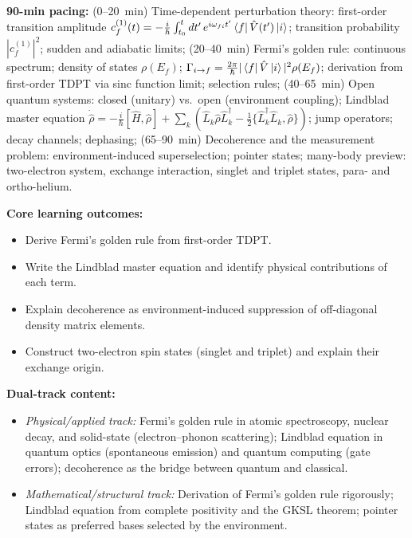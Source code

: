 \documentclass[11pt,a4paper]{article}
\begin{document}
\medskip
\begin{tcolorbox}[modulebox, title={Module~I.3 --- Lecture L10: Time-Dependent PT, Open Systems, and Many-Body Preview}]
\textbf{90-min pacing:} (0--20~min) Time-dependent perturbation theory:
first-order transition amplitude
$c_f^{(1)}(t)=-\tfrac{i}{\hbar}\int_{t_0}^{t}dt'\,e^{i\omega_{fi}t'}\bra{f}\hat{V}(t')\ket{i}$;
transition probability $|c_f^{(1)}|^2$; sudden and adiabatic limits;
(20--40~min) Fermi's golden rule:
continuous spectrum; density of states $\rho(E_f)$;
$\Gamma_{i\to f}=\tfrac{2\pi}{\hbar}|\bra{f}\hat{V}\ket{i}|^2\rho(E_f)$;
derivation from first-order TDPT via sinc function limit; selection rules;
(40--65~min) Open quantum systems: closed (unitary) vs.\ open (environment coupling);
Lindblad master equation $\dot{\hat{\rho}}=-\tfrac{i}{\hbar}[\hat{H},\hat{\rho}]
+\sum_k({\hat{L}_k\hat{\rho}\hat{L}_k^\dagger-\tfrac{1}{2}\{\hat{L}_k^\dagger\hat{L}_k,\hat{\rho}\}})$;
jump operators; decay channels; dephasing;
(65--90~min) Decoherence and the measurement problem:
environment-induced superselection; pointer states;
many-body preview: two-electron system, exchange interaction, singlet and triplet states,
para- and ortho-helium.

\medskip\textbf{Core learning outcomes:}
\begin{itemize}[leftmargin=1.4em,topsep=2pt,itemsep=1pt]
  \item Derive Fermi's golden rule from first-order TDPT.
  \item Write the Lindblad master equation and identify physical contributions of each term.
  \item Explain decoherence as environment-induced suppression of off-diagonal density matrix elements.
  \item Construct two-electron spin states (singlet and triplet) and explain their exchange origin.
\end{itemize}

\medskip\textbf{Dual-track content:}
\begin{itemize}[leftmargin=1.4em,topsep=2pt,itemsep=1pt]
  \item \textit{Physical/applied track:} Fermi's golden rule in atomic spectroscopy,
    nuclear decay, and solid-state (electron--phonon scattering); Lindblad equation in
    quantum optics (spontaneous emission) and quantum computing (gate errors);
    decoherence as the bridge between quantum and classical.
  \item \textit{Mathematical/structural track:} Derivation of Fermi's golden rule rigorously;
    Lindblad equation from complete positivity and the GKSL theorem;
    pointer states as preferred bases selected by the environment.
\end{itemize}


\end{tcolorbox}
\end{document}
